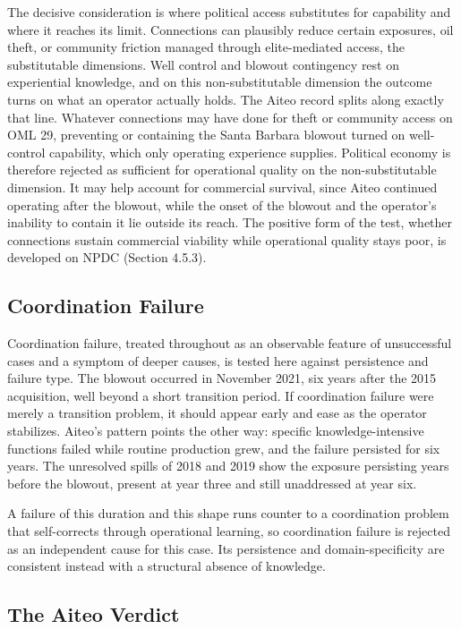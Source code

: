 The decisive consideration is where political access substitutes for
capability and where it reaches its limit. Connections can plausibly
reduce certain exposures, oil theft, or community friction managed
through elite-mediated access, the substitutable dimensions. Well
control and blowout contingency rest on experiential knowledge, and on
this non-substitutable dimension the outcome turns on what an operator
actually holds. The Aiteo record splits along exactly that line.
Whatever connections may have done for theft or community access on OML
29, preventing or containing the Santa Barbara blowout turned on
well-control capability, which only operating experience supplies.
Political economy is therefore rejected as sufficient for operational
quality on the non-substitutable dimension. It may help account for
commercial survival, since Aiteo continued operating after the blowout,
while the onset of the blowout and the operator's inability to contain
it lie outside its reach. The positive form of the test, whether
connections sustain commercial viability while operational quality stays
poor, is developed on NPDC (Section 4.5.3).

\hypertarget{coordination-failure}{%
\subsection{Coordination Failure}\label{coordination-failure}}

Coordination failure, treated throughout as an observable feature of
unsuccessful cases and a symptom of deeper causes, is tested here
against persistence and failure type. The blowout occurred in November
2021, six years after the 2015 acquisition, well beyond a short
transition period. If coordination failure were merely a transition
problem, it should appear early and ease as the operator stabilizes.
Aiteo's pattern points the other way: specific knowledge-intensive
functions failed while routine production grew, and the failure
persisted for six years. The unresolved spills of 2018 and 2019 show the
exposure persisting years before the blowout, present at year three and
still unaddressed at year six.

A failure of this duration and this shape runs counter to a coordination
problem that self-corrects through operational learning, so coordination
failure is rejected as an independent cause for this case. Its
persistence and domain-specificity are consistent instead with a
structural absence of knowledge.

\hypertarget{the-aiteo-verdict}{%
\subsection{The Aiteo Verdict}\label{the-aiteo-verdict}}

